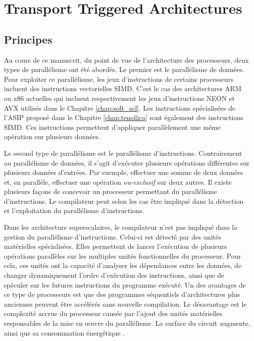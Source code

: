 \section{Transport Triggered Architectures}
\label{sec:tta_description}

\subsection{Principes}

Au cours de ce manuscrit, du point de vue de l'architecture des processeurs, deux types de parallélisme ont été abordés.
Le premier est le parallélisme de données.
Pour exploiter ce parallélisme, les jeux d'instructions de certains processeurs incluent des instructions vectorielles SIMD.
C'est le cas des architectures ARM ou x86 actuelles qui incluent respectivement les jeux d'instructions NEON et AVX utilisés dans le Chapitre \ref{chap:soft_scl}.
Les instructions spécialisées de l'ASIP proposé dans le Chapitre \ref{chap:tensilica} sont également des instructions SIMD.
Ces instructions permettent d'appliquer parallèlement une même opération sur plusieurs données.

Le second type de parallélisme est le parallélisme d'instructions. Contrairement au parallélisme de données, il s'agit d'exécuter plusieurs opérations différentes sur plusieurs données d'entrées. Par exemple, effectuer une somme de deux données et, en parallèle, effectuer une opération \textit{ou-exclusif} sur deux autres.
Il existe plusieurs façons de concevoir un processeur permettant du parallélisme d'instructions. Le compilateur peut selon les cas être impliqué dans la détection et l'exploitation du parallélisme d'instructions.

Dans les architecture superscalaires, le compilateur n'est pas impliqué dans la gestion du parallélisme d'instructions. Celui-ci est détecté par des unités matérielles spécialisées. 
Elles permettent de lancer l'exécution de plusieurs opérations parallèles sur les multiples unités fonctionnelles du processeur.
Pour cela, ces unités ont la capacité d'analyser les dépendances entre les données, de changer dynamiquement l'ordre d'exécution des instructions, ainsi que de spéculer sur les futures instructions du programme exécuté. 
Un des avantages de ce type de processeurs est que des programmes séquentiels d'architectures plus anciennes peuvent être accélérés sans nouvelle compilation. Le désavantage est le complexité accrue du processeur causée par l'ajout des unités matérielles responsables de la mise en œuvre du parallélisme. La surface du circuit augmente, ainsi que sa consommation énergétique \cite{rau1993instruction}.

